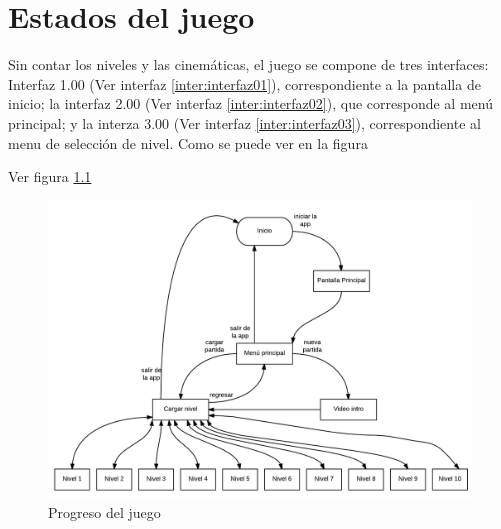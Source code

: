 \chapter{Estados del juego}
Sin contar los niveles y las cinemáticas, el juego se compone de tres interfaces: Interfaz 1.00 (Ver interfaz \ref{inter:interfaz01}), correspondiente a la pantalla de inicio; la interfaz 2.00 (Ver interfaz \ref{inter:interfaz02}), que corresponde al menú principal; y la interza 3.00 (Ver interfaz \ref{inter:interfaz03}), correspondiente al menu de selección de nivel. Como se puede ver en la figura %

Ver figura \ref{fig:EstadosJuego}
\begin{figure}
  \centering
     \includegraphics[width=\linewidth]{Imagenes/estadosJuego}
  \caption{Progreso del juego}
  \label{fig:EstadosJuego}
\end{figure} 